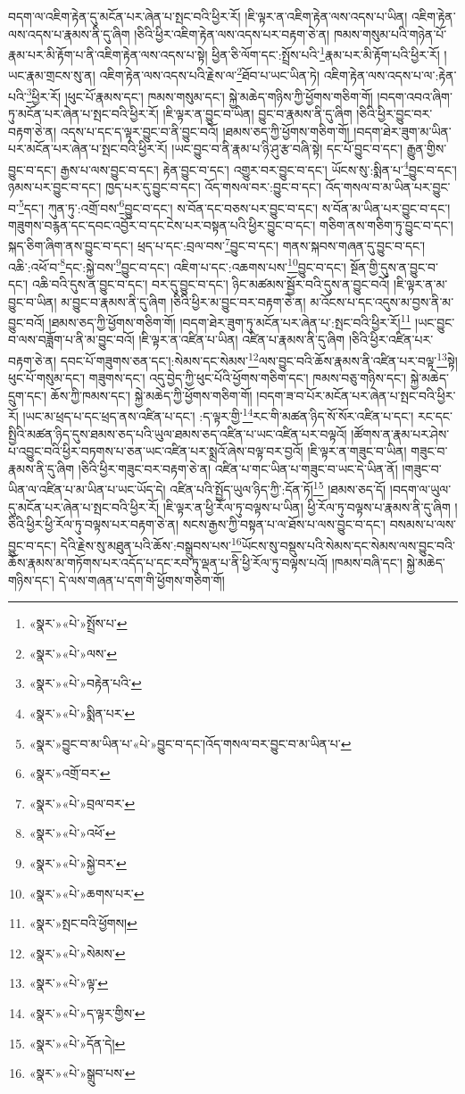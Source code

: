 བདག་ལ་འཇིག་རྟེན་དུ་མངོན་པར་ཞེན་པ་སྤང་བའི་ཕྱིར་རོ། །ཇི་ལྟར་ན་འཇིག་རྟེན་ལས་འདས་པ་ཡིན། འཇིག་རྟེན་ལས་འདས་པ་རྣམས་ནི་དུ་ཞིག །ཅིའི་ཕྱིར་འཇིག་རྟེན་ལས་འདས་པར་བརྟག་ཅེ་ན། ཁམས་གསུམ་པའི་གཉེན་པོ་རྣམ་པར་མི་རྟོག་པ་ནི་འཇིག་རྟེན་ལས་འདས་པ་སྟེ། ཕྱིན་ཅི་ལོག་དང་:སྤྲོས་པའི་\footnote{«སྣར་»«པེ་»སྤྲོས་པ་}རྣམ་པར་མི་རྟོག་པའི་ཕྱིར་རོ། །ཡང་རྣམ་གྲངས་སུ་ན། འཇིག་རྟེན་ལས་འདས་པའི་རྗེས་ལ་\footnote{«སྣར་»«པེ་»ལས་}ཐོབ་པ་ཡང་ཡིན་ཏེ། འཇིག་རྟེན་ལས་འདས་པ་ལ་:རྟེན་པའི་\footnote{«སྣར་»«པེ་»བརྟེན་པའི་}ཕྱིར་རོ། །ཕུང་པོ་རྣམས་དང་། ཁམས་གསུམ་དང་། སྐྱེ་མཆེད་གཉིས་ཀྱི་ཕྱོགས་གཅིག་གོ། །བདག་འབའ་ཞིག་ཏུ་མངོན་པར་ཞེན་པ་སྤང་བའི་ཕྱིར་རོ། །ཇི་ལྟར་ན་བྱུང་བ་ཡིན། བྱུང་བ་རྣམས་ནི་དུ་ཞིག །ཅིའི་ཕྱིར་བྱུང་བར་བརྟག་ཅེ་ན། འདས་པ་དང་ད་ལྟར་བྱུང་བ་ནི་བྱུང་བའོ། །ཐམས་ཅད་ཀྱི་ཕྱོགས་གཅིག་གོ། །བདག་ཐེར་ཟུག་མ་ཡིན་པར་མངོན་པར་ཞེན་པ་སྤང་བའི་ཕྱིར་རོ། །ཡང་བྱུང་བ་ནི་རྣམ་པ་ཉི་ཤུ་རྩ་བཞི་སྟེ། དང་པོ་བྱུང་བ་དང་། རྒྱུན་གྱིས་བྱུང་བ་དང་། རྒྱས་པ་ལས་བྱུང་བ་དང་། རྟེན་བྱུང་བ་དང་། འགྱུར་བར་བྱུང་བ་དང་། ཡོངས་སུ་:སྨིན་པ་\footnote{«སྣར་»«པེ་»སྨིན་པར་}བྱུང་བ་དང་། ཉམས་པར་བྱུང་བ་དང་། ཁྱད་པར་དུ་བྱུང་བ་དང་། འོད་གསལ་བར་:བྱུང་བ་དང་། འོད་གསལ་བ་མ་ཡིན་པར་བྱུང་བ་\footnote{«སྣར་»བྱུང་བ་མ་ཡིན་པ་«པེ་»བྱུང་བ་དང་།འོད་གསལ་བར་བྱུང་བ་མ་ཡིན་པ་}དང་། ཀུན་ཏུ་:འགྲོ་བས་\footnote{«སྣར་»འགྲོ་བར་}བྱུང་བ་དང་། ས་བོན་དང་བཅས་པར་བྱུང་བ་དང་། ས་བོན་མ་ཡིན་པར་བྱུང་བ་དང་། གཟུགས་བརྙན་དང་དབང་འབྱོར་བ་དང་ངེས་པར་བསྟན་པའི་ཕྱིར་བྱུང་བ་དང་། གཅིག་ནས་གཅིག་ཏུ་བྱུང་བ་དང་། སྐད་ཅིག་ཞིག་ནས་བྱུང་བ་དང་། ཕྲད་པ་དང་:བྲལ་བས་\footnote{«སྣར་»«པེ་»བྲལ་བར་}བྱུང་བ་དང་། གནས་སྐབས་གཞན་དུ་བྱུང་བ་དང་། འཆི་:འཕོ་བ་\footnote{«སྣར་»«པེ་»འཕོ་}དང་:སྐྱེ་བས་\footnote{«སྣར་»«པེ་»སྐྱེ་བར་}བྱུང་བ་དང་། འཇིག་པ་དང་:འཆགས་པས་\footnote{«སྣར་»«པེ་»ཆགས་པར་}བྱུང་བ་དང་། སྔོན་གྱི་དུས་ན་བྱུང་བ་དང་། འཆི་བའི་དུས་ན་བྱུང་བ་དང་། བར་དུ་བྱུང་བ་དང་། ཉིང་མཚམས་སྦྱོར་བའི་དུས་ན་བྱུང་བའོ། །ཇི་ལྟར་ན་མ་བྱུང་བ་ཡིན། མ་བྱུང་བ་རྣམས་ནི་དུ་ཞིག །ཅིའི་ཕྱིར་མ་བྱུང་བར་བརྟག་ཅེ་ན། མ་འོངས་པ་དང་འདུས་མ་བྱས་ནི་མ་བྱུང་བའོ། །ཐམས་ཅད་ཀྱི་ཕྱོགས་གཅིག་གོ། །བདག་ཐེར་ཟུག་ཏུ་མངོན་པར་ཞེན་པ་:སྤང་བའི་ཕྱིར་རོ།\footnote{«སྣར་»སྤང་བའི་ཕྱོགས།} །ཡང་བྱུང་བ་ལས་བཟློག་པ་ནི་མ་བྱུང་བའོ། །ཇི་ལྟར་ན་འཛིན་པ་ཡིན། འཛིན་པ་རྣམས་ནི་དུ་ཞིག །ཅིའི་ཕྱིར་འཛིན་པར་བརྟག་ཅེ་ན། དབང་པོ་གཟུགས་ཅན་དང་།:སེམས་དང་སེམས་\footnote{«སྣར་»«པེ་»སེམས་}ལས་བྱུང་བའི་ཆོས་རྣམས་ནི་འཛིན་པར་བལྟ་\footnote{«སྣར་»«པེ་»ལྟ་}སྟེ། ཕུང་པོ་གསུམ་དང་། གཟུགས་དང་། འདུ་བྱེད་ཀྱི་ཕུང་པོའི་ཕྱོགས་གཅིག་དང་། ཁམས་བཅུ་གཉིས་དང་། སྐྱེ་མཆེད་དྲུག་དང་། ཆོས་ཀྱི་ཁམས་དང་། སྐྱེ་མཆེད་ཀྱི་ཕྱོགས་གཅིག་གོ། །བདག་ཟ་བ་པོར་མངོན་པར་ཞེན་པ་སྤང་བའི་ཕྱིར་རོ། །ཡང་མ་ཕྲད་པ་དང་ཕྲད་ནས་འཛིན་པ་དང་། :ད་ལྟར་གྱི་\footnote{«སྣར་»«པེ་»ད་ལྟར་གྱིས་}རང་གི་མཚན་ཉིད་སོ་སོར་འཛིན་པ་དང་། རང་དང་སྤྱིའི་མཚན་ཉིད་དུས་ཐམས་ཅད་པའི་ཡུལ་ཐམས་ཅད་འཛིན་པ་ཡང་འཛིན་པར་བལྟའོ། །ཚོགས་ན་རྣམ་པར་ཤེས་པ་འབྱུང་བའི་ཕྱིར་བཏགས་པ་ཅན་ཡང་འཛིན་པར་སྨྲའོ་ཞེས་བལྟ་བར་བྱའོ། །ཇི་ལྟར་ན་གཟུང་བ་ཡིན། གཟུང་བ་རྣམས་ནི་དུ་ཞིག །ཅིའི་ཕྱིར་གཟུང་བར་བརྟག་ཅེ་ན། འཛིན་པ་གང་ཡིན་པ་གཟུང་བ་ཡང་དེ་ཡིན་ནོ། །གཟུང་བ་ཡིན་ལ་འཛིན་པ་མ་ཡིན་པ་ཡང་ཡོད་དེ། འཛིན་པའི་སྤྱོད་ཡུལ་ཉིད་ཀྱི་:དོན་ཏོ།\footnote{«སྣར་»«པེ་»དོན་དེ།} །ཐམས་ཅད་དོ། །བདག་ལ་ཡུལ་དུ་མངོན་པར་ཞེན་པ་སྤང་བའི་ཕྱིར་རོ། །ཇི་ལྟར་ན་ཕྱི་རོལ་ཏུ་བལྟས་པ་ཡིན། ཕྱི་རོལ་ཏུ་བལྟས་པ་རྣམས་ནི་དུ་ཞིག །ཅིའི་ཕྱིར་ཕྱི་རོལ་ཏུ་བལྟས་པར་བརྟག་ཅེ་ན། སངས་རྒྱས་ཀྱི་བསྟན་པ་ལ་ཐོས་པ་ལས་བྱུང་བ་དང་། བསམས་པ་ལས་བྱུང་བ་དང་། དེའི་རྗེས་སུ་མཐུན་པའི་ཆོས་:བསྒྲུབས་པས་\footnote{«སྣར་»«པེ་»སྒྲུབ་པས་}ཡོངས་སུ་བསྡུས་པའི་སེམས་དང་སེམས་ལས་བྱུང་བའི་ཆོས་རྣམས་མ་གཏོགས་པར་འདོད་པ་དང་རབ་ཏུ་ལྡན་པ་ནི་ཕྱི་རོལ་ཏུ་བལྟས་པའོ། །ཁམས་བཞི་དང་། སྐྱེ་མཆེད་གཉིས་དང་། དེ་ལས་གཞན་པ་དག་གི་ཕྱོགས་གཅིག་གོ། 